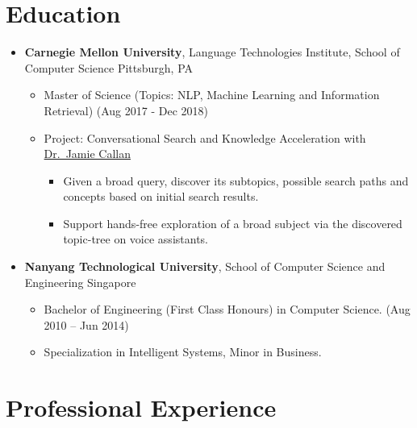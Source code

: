 
\section{Education}\label{education}

\begin{itemize}
\tightlist
\item
  \textbf{Carnegie Mellon University}, Language Technologies Institute,
  School of Computer Science \hfill Pittsburgh, PA

  \begin{itemize}
  \tightlist
  \item
    Master of Science (Topics: NLP, Machine Learning and Information
    Retrieval) \hfill (Aug 2017 - Dec 2018)
  \item
    Project: Conversational Search and Knowledge Acceleration with
    \href{http://www.cs.cmu.edu/~callan/}{Dr.~Jamie Callan}

    \begin{itemize}
    \tightlist
    \item
      Given a broad query, discover its subtopics, possible search paths
      and concepts based on initial search results.
    \item
      Support hands-free exploration of a broad subject via the
      discovered topic-tree on voice assistants.
    \end{itemize}
  \end{itemize}
\item
  \textbf{Nanyang Technological University}, School of Computer Science
  and Engineering \hfill Singapore

  \begin{itemize}
  \tightlist
  \item
    Bachelor of Engineering (First Class Honours) in Computer Science.
    \hfill (Aug 2010 -- Jun 2014)
  \item
    Specialization in Intelligent Systems, Minor in Business.
  \end{itemize}
\end{itemize}

\section{Professional Experience}\label{professional-experience}

